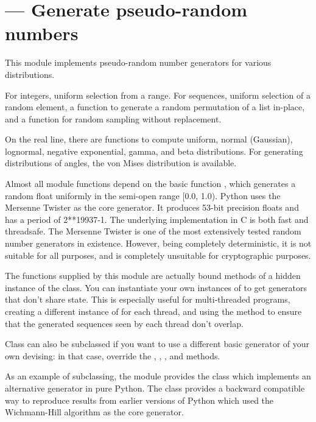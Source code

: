 \section{ ---
         Generate pseudo-random numbers}



This module implements pseudo-random number generators for various
distributions.

For integers, uniform selection from a range.
For sequences, uniform selection of a random element, a function to
generate a random permutation of a list in-place, and a function for
random sampling without replacement.

On the real line, there are functions to compute uniform, normal (Gaussian),
lognormal, negative exponential, gamma, and beta distributions.
For generating distributions of angles, the von Mises distribution
is available.

Almost all module functions depend on the basic function
, which generates a random float uniformly in
the semi-open range [0.0, 1.0).  Python uses the Mersenne Twister as
the core generator.  It produces 53-bit precision floats and has a
period of 2**19937-1.  The underlying implementation in C 
is both fast and threadsafe.  The Mersenne Twister is one of the most
extensively tested random number generators in existence.  However, being
completely deterministic, it is not suitable for all purposes, and is
completely unsuitable for cryptographic purposes.

The functions supplied by this module are actually bound methods of a
hidden instance of the  class.  You can
instantiate your own instances of  to get generators
that don't share state.  This is especially useful for multi-threaded
programs, creating a different instance of  for each
thread, and using the  method to ensure that the
generated sequences seen by each thread don't overlap.

Class  can also be subclassed if you want to use a
different basic generator of your own devising: in that case, override
the , , ,
 and  methods.

As an example of subclassing, the  module provides
the  class which implements an alternative generator
in pure Python.  The class provides a backward compatible way to
reproduce results from earlier versions of Python which used the
Wichmann-Hill algorithm as the core generator.


